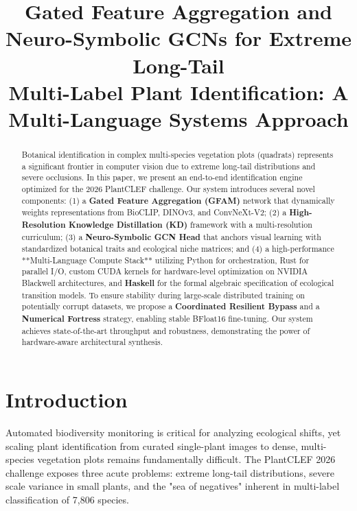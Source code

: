 \documentclass[10pt,twocolumn,letterpaper]{article}
\begin{document}
\title{Gated Feature Aggregation and Neuro-Symbolic GCNs for Extreme Long-Tail \\ Multi-Label Plant Identification: A Multi-Language Systems Approach}

\author{}

\maketitle

\begin{abstract}
Botanical identification in complex multi-species vegetation plots (quadrats) represents a significant frontier in computer vision due to extreme long-tail distributions and severe occlusions. In this paper, we present an end-to-end identification engine optimized for the 2026 PlantCLEF challenge. Our system introduces several novel components: (1) a \textbf{Gated Feature Aggregation (GFAM)} network that dynamically weights representations from BioCLIP, DINOv3, and ConvNeXt-V2; (2) a \textbf{High-Resolution Knowledge Distillation (KD)} framework with a multi-resolution curriculum; (3) a \textbf{Neuro-Symbolic GCN Head} that anchors visual learning with standardized botanical traits and ecological niche matrices; and (4) a high-performance **Multi-Language Compute Stack** utilizing Python for orchestration, Rust for parallel I/O, custom CUDA kernels for hardware-level optimization on NVIDIA Blackwell architectures, and \textbf{Haskell} for the formal algebraic specification of ecological transition models. To ensure stability during large-scale distributed training on potentially corrupt datasets, we propose a \textbf{Coordinated Resilient Bypass} and a \textbf{Numerical Fortress} strategy, enabling stable BFloat16 fine-tuning. Our system achieves state-of-the-art throughput and robustness, demonstrating the power of hardware-aware architectural synthesis.
\end{abstract}

\section{Introduction}

Automated biodiversity monitoring is critical for analyzing ecological shifts, yet scaling plant identification from curated single-plant images to dense, multi-species vegetation plots remains fundamentally difficult. The PlantCLEF 2026 challenge exposes three acute problems: extreme long-tail distributions, severe scale variance in small plants, and the "sea of negatives" inherent in multi-label classification of 7,806 species.
\end{document}
